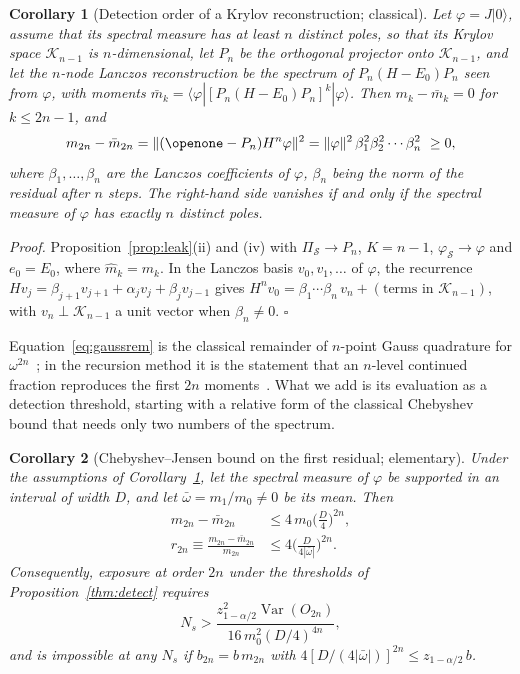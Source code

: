 \documentclass[aps,prb,reprint,onecolumn,12pt,superscriptaddress,longbibliography,floatfix]{revtex4-2}
\newtheorem{corollary}{Corollary}
\begin{document}
\begin{corollary}[Detection order of a Krylov reconstruction; classical]
\label{cor:krylov}
Let $\varphi=J|0\rangle$, assume that its spectral measure has at least $n$ distinct poles, so that its Krylov space $\mathcal K_{n-1}$ is $n$-dimensional, let $P_n$ be the orthogonal projector onto $\mathcal K_{n-1}$, and let the $n$-node Lanczos reconstruction be the spectrum of $P_n(H-E_0)P_n$ seen from $\varphi$, with moments $\bar m_k=\langle\varphi|[P_n(H-E_0)P_n]^k|\varphi\rangle$. Then $m_k-\bar m_k=0$ for $k\le2n-1$, and
\begin{equation}
m_{2n}-\bar m_{2n}=\|(\openone-P_n)H^n\varphi\|^2=\|\varphi\|^2\,\beta_1^2\beta_2^2\cdots\beta_n^2\ \ge0 ,
\label{eq:gaussrem}
\end{equation}
where $\beta_1,\dots,\beta_n$ are the Lanczos coefficients of $\varphi$, $\beta_n$ being the norm of the residual after $n$ steps. The right-hand side vanishes if and only if the spectral measure of $\varphi$ has exactly $n$ distinct poles.
\end{corollary}

\noindent\emph{Proof.} Proposition~\ref{prop:leak}(ii) and (iv) with $\Pi_\mathcal S\to P_n$, $K=n-1$, $\varphi_\mathcal S\to\varphi$ and $e_0=E_0$, where $\widehat m_k=m_k$. In the Lanczos basis $v_0,v_1,\dots$ of $\varphi$, the recurrence $Hv_j=\beta_{j+1}v_{j+1}+\alpha_jv_j+\beta_jv_{j-1}$ gives $H^nv_0=\beta_1\cdots\beta_n\,v_n+(\text{terms in }\mathcal K_{n-1})$, with $v_n\perp\mathcal K_{n-1}$ a unit vector when $\beta_n\neq0$. $\square$

\noindent Equation~\eqref{eq:gaussrem} is the classical remainder of $n$-point Gauss quadrature for $\omega^{2n}$~\cite{GM2010,Szego1975,Gautschi2004}; in the recursion method it is the statement that an $n$-level continued fraction reproduces the first $2n$ moments~\cite{Haydock1975,ViswanathMuller1994}. What we add is its evaluation as a detection threshold, starting with a relative form of the classical Chebyshev bound that needs only two numbers of the spectrum.

\begin{corollary}[Chebyshev--Jensen bound on the first residual; elementary]
\label{cor:cheb}
Under the assumptions of Corollary~\ref{cor:krylov}, let the spectral measure of $\varphi$ be supported in an interval of width $D$, and let $\bar\omega=m_1/m_0\neq0$ be its mean. Then
\begin{equation}
\begin{split}
m_{2n}-\bar m_{2n}&\le4\,m_0\Big(\frac D4\Big)^{2n},\\
r_{2n}\equiv\frac{m_{2n}-\bar m_{2n}}{m_{2n}}&\le4\Big(\frac{D}{4|\bar\omega|}\Big)^{2n}.
\end{split}
\label{eq:chebbound}
\end{equation}
Consequently, exposure at order $2n$ under the thresholds of Proposition~\ref{thm:detect} requires
\begin{equation}
N_s>\frac{z_{1-\alpha/2}^2\operatorname{Var}(O_{2n})}{16\,m_0^2(D/4)^{4n}},
\label{eq:chebNs}
\end{equation}
and is impossible at any $N_s$ if $b_{2n}=b\,m_{2n}$ with $4[D/(4|\bar\omega|)]^{2n}\le z_{1-\alpha/2}\,b$.
\end{corollary}
\end{document}

